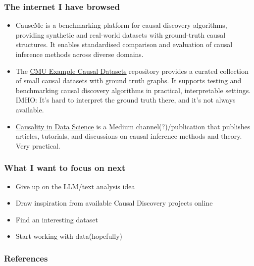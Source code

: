 \documentclass[t,24pt,aspectratio=169]{beamer}
\begin{document}
\begin{frame}[hoved]
\frametitle{The internet I have browsed}
\begin{itemize}
    \item CauseMe\cite{runge2022causeme} is a benchmarking platform for causal discovery algorithms, providing synthetic and real-world datasets with ground-truth causal structures. It enables standardised comparison and evaluation of causal inference methods across diverse domains.
    \item The \href{https://github.com/cmu-phil/example-causal-datasets/tree/main}{CMU Example Causal Datasets} repository provides a curated collection of small causal datasets with ground truth graphs. It supports testing and benchmarking causal discovery algorithms in practical, interpretable settings. IMHO: It's hard to interpret the ground truth there, and it's not always available.

    \item \href{https://medium.com/causality-in-data-science}{Causality in Data Science} is a Medium channel(?)/publication that publishes articles, tutorials, and discussions on causal inference methods and theory. Very practical. 
    
\end{itemize}
\end{frame}

\begin{frame}[hoved]
\frametitle{What I want to focus on next}
\begin{itemize}
    \item Give up on the LLM/text analysis idea
    \item Draw inspiration from available Causal Discovery projects online
    \item Find an interesting dataset
    \item Start working with data(hopefully)

    
    
\end{itemize}
\end{frame}


\begin{frame}[hoved]
\frametitle{References}
{}
\end{frame}


\end{document}

